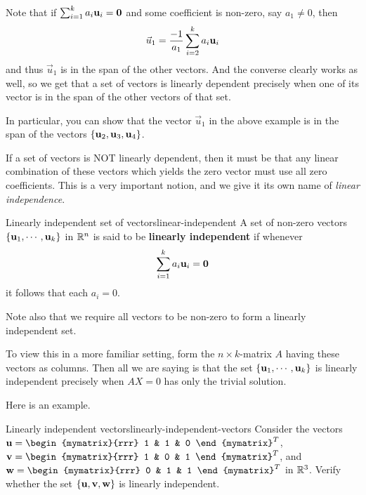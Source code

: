 Note that if $\sum_{i=1}^{k}a_{i}\mbox{\bf u}_{i}=\mbox{\bf 0}$ and some
coefficient is non-zero, say $a_1 \neq 0$, then 
\begin{equation*}
\vec{u}_1 = \frac{-1}{a_1} \sum_{i=2}^{k}a_{i}\mbox{\bf u}_{i} 
\end{equation*}
and thus $\vec{u}_1$ is in the span of the other vectors. And the converse clearly works as well,
so we get that a set of vectors is linearly dependent precisely when
one of its vector is in the span of the other vectors of that set.

In particular, you can show that the vector $\vec{u}_1$ in the above
example is in the span of the vectors  $\{\mbox{\bf u}_2, \mbox{\bf u}_3, \mbox{\bf u}_4\}$. 

If a set of vectors is NOT linearly dependent, then it must be that
any linear combination of these vectors which yields the zero vector
must use all zero coefficients. This is a very important notion, and we give it its own name of {\em
linear independence}. 

\begin{definition}{Linearly independent set of vectors}{linear-independent}
A set of non-zero vectors $\{\mbox{\bf u}_1, \cdots ,\mbox{\bf u}_k\}$ in $\mathbb{R}^{n}$ is said to be 
\textbf{linearly independent} if whenever 
\begin{equation*}
\sum_{i=1}^{k}a_{i}\mbox{\bf u}_{i}=\mbox{\bf 0}
\end{equation*}
it follows that each $a_{i}=0$.
\end{definition}


Note also that we require all vectors to be non-zero to form a
linearly independent set.

To view this in a more familiar setting, form the $n \times k$-matrix
$A$ having these vectors as columns. Then all we are saying is that
the set $\{\mbox{\bf u}_1, \cdots ,\mbox{\bf u}_k\}$ is linearly independent
precisely when $AX=0$ has only the trivial solution.

Here is an example.  

\begin{example}{Linearly independent vectors}{linearly-independent-vectors}
Consider the vectors $\vect{u}=\begin{mymatrix}{rrr}
1  & 1 & 0
\end{mymatrix}^T$, 
$\vect{v}=\begin{mymatrix}{rrr}
1  & 0 & 1
\end{mymatrix}^T$, and
$\vect{w}=\begin{mymatrix}{rrr}
0  & 1 & 1
\end{mymatrix}^T$ in $\mathbb{R}^{3}$.
Verify whether the set $\{\mbox{\bf u}, \mbox{\bf v}, \mbox{\bf w}\}$ is linearly independent. 
\end{example}

